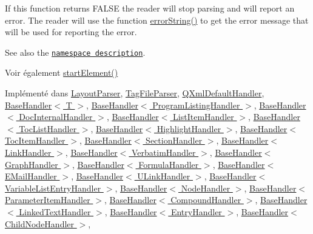 If this function returns F\+A\+L\+S\+E the reader will stop parsing and will report an error. The reader will use the function \hyperlink{class_q_xml_content_handler_adba96547bad1cf1b009dbfb7b7c571be}{error\+String()} to get the error message that will be used for reporting the error.

See also the \href{xml-sax.html#namespaces}{\tt namespace description}.

\begin{DoxySeeAlso}{Voir également}
\hyperlink{class_q_xml_content_handler_af6d4e631fad2b9b75622c95003b1da55}{start\+Element()} 
\end{DoxySeeAlso}


Implémenté dans \hyperlink{class_layout_parser_aded617e52b2a221ed57c29ac79da360b}{Layout\+Parser}, \hyperlink{class_tag_file_parser_aeb0fd2877b6d5fc40a15f7c7bec19ee0}{Tag\+File\+Parser}, \hyperlink{class_q_xml_default_handler_ae5d92a2fbae15a793aedf725b62b16c2}{Q\+Xml\+Default\+Handler}, \hyperlink{class_base_handler_aa1b987506d2f962ba478b8bab388bff9}{Base\+Handler$<$ T $>$}, \hyperlink{class_base_handler_aa1b987506d2f962ba478b8bab388bff9}{Base\+Handler$<$ Program\+Listing\+Handler $>$}, \hyperlink{class_base_handler_aa1b987506d2f962ba478b8bab388bff9}{Base\+Handler$<$ Doc\+Internal\+Handler $>$}, \hyperlink{class_base_handler_aa1b987506d2f962ba478b8bab388bff9}{Base\+Handler$<$ List\+Item\+Handler $>$}, \hyperlink{class_base_handler_aa1b987506d2f962ba478b8bab388bff9}{Base\+Handler$<$ Toc\+List\+Handler $>$}, \hyperlink{class_base_handler_aa1b987506d2f962ba478b8bab388bff9}{Base\+Handler$<$ Highlight\+Handler $>$}, \hyperlink{class_base_handler_aa1b987506d2f962ba478b8bab388bff9}{Base\+Handler$<$ Toc\+Item\+Handler $>$}, \hyperlink{class_base_handler_aa1b987506d2f962ba478b8bab388bff9}{Base\+Handler$<$ Section\+Handler $>$}, \hyperlink{class_base_handler_aa1b987506d2f962ba478b8bab388bff9}{Base\+Handler$<$ Link\+Handler $>$}, \hyperlink{class_base_handler_aa1b987506d2f962ba478b8bab388bff9}{Base\+Handler$<$ Verbatim\+Handler $>$}, \hyperlink{class_base_handler_aa1b987506d2f962ba478b8bab388bff9}{Base\+Handler$<$ Graph\+Handler $>$}, \hyperlink{class_base_handler_aa1b987506d2f962ba478b8bab388bff9}{Base\+Handler$<$ Formula\+Handler $>$}, \hyperlink{class_base_handler_aa1b987506d2f962ba478b8bab388bff9}{Base\+Handler$<$ E\+Mail\+Handler $>$}, \hyperlink{class_base_handler_aa1b987506d2f962ba478b8bab388bff9}{Base\+Handler$<$ U\+Link\+Handler $>$}, \hyperlink{class_base_handler_aa1b987506d2f962ba478b8bab388bff9}{Base\+Handler$<$ Variable\+List\+Entry\+Handler $>$}, \hyperlink{class_base_handler_aa1b987506d2f962ba478b8bab388bff9}{Base\+Handler$<$ Node\+Handler $>$}, \hyperlink{class_base_handler_aa1b987506d2f962ba478b8bab388bff9}{Base\+Handler$<$ Parameter\+Item\+Handler $>$}, \hyperlink{class_base_handler_aa1b987506d2f962ba478b8bab388bff9}{Base\+Handler$<$ Compound\+Handler $>$}, \hyperlink{class_base_handler_aa1b987506d2f962ba478b8bab388bff9}{Base\+Handler$<$ Linked\+Text\+Handler $>$}, \hyperlink{class_base_handler_aa1b987506d2f962ba478b8bab388bff9}{Base\+Handler$<$ Entry\+Handler $>$}, \hyperlink{class_base_handler_aa1b987506d2f962ba478b8bab388bff9}{Base\+Handler$<$ Child\+Node\+Handler $>$}, 